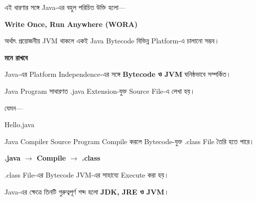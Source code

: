 এই ধারণার সঙ্গে Java-এর বহুল পরিচিত উক্তি হলো—

\begin{center}

\textbf{Write Once, Run Anywhere (WORA)}

\end{center}

অর্থাৎ প্রয়োজনীয় JVM থাকলে একই Java Bytecode বিভিন্ন Platform-এ
চালানো সম্ভব।

\begin{rememberbox}

\textbf{\color{deepOrange}মনে রাখবে}

Java-এর Platform Independence-এর সঙ্গে
\textbf{Bytecode ও JVM} ঘনিষ্ঠভাবে সম্পর্কিত।

\end{rememberbox}


Java Program সাধারণত \textenglish{\ttfamily .java} Extension-যুক্ত
Source File-এ লেখা হয়।

যেমন—

\begin{center}

{\textenglish{\ttfamily Hello.java}}

\end{center}

Java Compiler Source Program Compile করলে Bytecode-যুক্ত
\textenglish{\ttfamily .class} File তৈরি হতে পারে।

\begin{center}

\textbf{
\textenglish{\ttfamily .java}
\(\longrightarrow\)
Compile
\(\longrightarrow\)
\textenglish{\ttfamily .class}
}

\end{center}

\textenglish{\ttfamily .class} File-এর Bytecode JVM-এর সাহায্যে
Execute করা হয়।


Java-এর ক্ষেত্রে তিনটি গুরুত্বপূর্ণ শব্দ হলো
\textbf{JDK, JRE ও JVM}।

